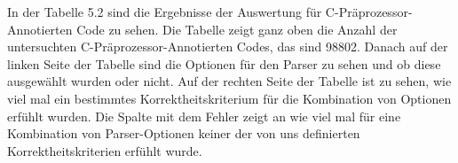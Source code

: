 In der Tabelle 5.2 sind die Ergebnisse der Auswertung für C-Präprozessor-Annotierten Code zu sehen. Die Tabelle zeigt ganz oben die Anzahl der untersuchten C-Präprozessor-Annotierten Codes, das sind 98802. Danach auf der linken Seite der Tabelle sind die Optionen für den Parser zu sehen und ob diese ausgewählt wurden oder nicht. Auf der rechten Seite der Tabelle ist zu sehen, wie viel mal ein bestimmtes Korrektheitskriterium für die Kombination von Optionen erfühlt wurden. Die Spalte mit dem Fehler zeigt an wie viel mal für eine Kombination von Parser-Optionen keiner der von uns definierten Korrektheitskriterien erfühlt wurde.\\

\begin{table}[H]
\caption{Ergebnisse der Auswertung für das Unparsen von C-Präprozessor-Annotierten Code}
\end{table}


